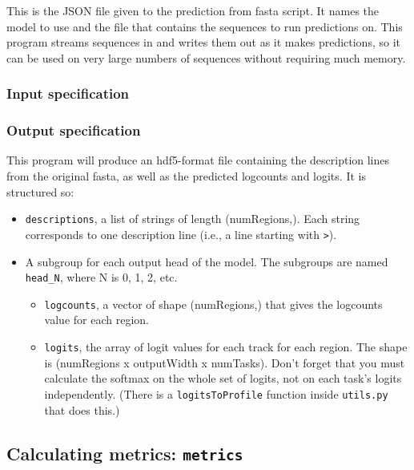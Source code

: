 \documentclass{article}
\begin{document}
This is the JSON file given to the prediction from fasta script.
It names the model to use and the file that contains the sequences to run
predictions on.
This program streams sequences in and writes them out as it makes predictions,
so it can be used on very large numbers of sequences without requiring much
memory.

\subsubsection{Input specification}



\subsubsection{Output specification}

This program will produce an hdf5-format file containing the description lines
from the original fasta, as well as the predicted logcounts and logits.
It is structured so:

\begin{itemize}
    \item \texttt{descriptions}, a list of strings of length (numRegions,).
        Each string corresponds to one description line (i.e., a line starting
        with \texttt{>}).
    \item A subgroup for each output head of the model.
        The subgroups are named \texttt{head\_N}, where N is 0, 1, 2, etc.
        \begin{itemize}
            \item \texttt{logcounts}, a vector of shape (numRegions,) that gives
                the logcounts value for each region.
            \item \texttt{logits}, the array of logit values for each track for
                each region.
                The shape is (numRegions x outputWidth x numTasks).
                Don't forget that you must calculate the softmax on the whole
                set of logits, not on each task's logits independently.
                (There is a \texttt{logitsToProfile} function inside
                \texttt{utils.py} that does this.)
        \end{itemize}
\end{itemize}

\newpage

\subsection{Calculating metrics: \texttt{metrics}}\label{prog:metrics}
\end{document}
